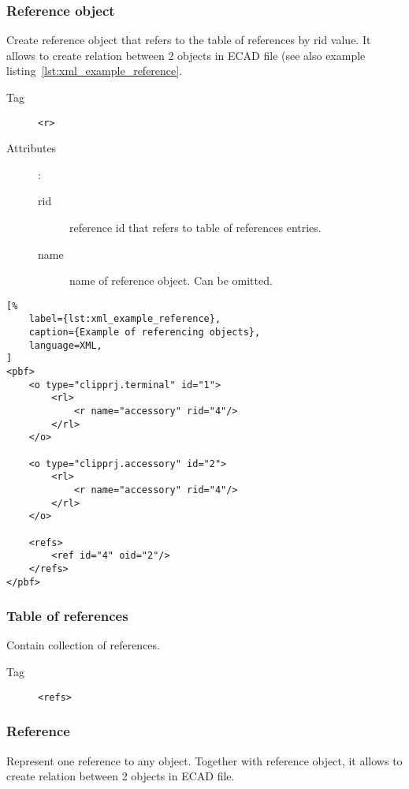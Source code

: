 \documentclass[%
	a4paper,
	oneside,
	listof=numbered,
	parskip=half,
	headsepline=true,
	footsepline=false,
	normalheadings,
	0.7headlines,
	headexclude,
	]{scrbook}
\begin{document}
\subsubsection{Reference object}

Create reference object that refers to the table of references by rid value.
It allows to create relation between 2 objects in ECAD file (see also example listing~\ref{lst:xml_example_reference}.

\begin{description}
	\item[Tag] \verb|<r>|
	\item[Attributes]:
	
	\begin{description}
		\item[rid] reference id that refers to table of references entries.
		\item[name] name of reference object.
		Can be omitted.
	\end{description}
\end{description}

\begin{lstlisting}[%
	label={lst:xml_example_reference},
	caption={Example of referencing objects},
	language=XML,
]
<pbf>
	<o type="clipprj.terminal" id="1">
		<rl>
			<r name="accessory" rid="4"/>
		</rl>
	</o>

	<o type="clipprj.accessory" id="2">
		<rl>
			<r name="accessory" rid="4"/>
		</rl>
	</o>

	<refs>
		<ref id="4" oid="2"/>
	</refs>
</pbf>
\end{lstlisting}

\subsubsection{Table of references}

Contain collection of references.

\begin{description}
	\item[Tag] \verb|<refs>|
\end{description}

\subsubsection{Reference}

Represent one reference to any object.
Together with reference object, it allows to create relation between 2 objects in ECAD file.
\end{document}
